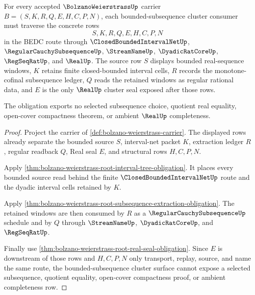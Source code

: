 \begin{theorem}
\label{thm:bolzano-weierstrass-bounded-subsequence-cluster-obligation}
For every accepted $\BolzanoWeierstrassUp$ carrier $B=(S,K,R,Q,E,H,C,P,N)$, each bounded-subsequence cluster consumer must traverse the concrete rows
$$
S,K,R,Q,E,H,C,P,N
$$
in the BEDC route through $\ClosedBoundedIntervalNetUp$, $\RegularCauchySubsequenceUp$, $\StreamNameUp$, $\DyadicRatCoreUp$, $\RegSeqRatUp$, and $\RealUp$. The source row $S$ displays bounded real-sequence windows, $K$ retains finite closed-bounded interval cells, $R$ records the monotone-cofinal subsequence ledger, $Q$ reads the retained windows as regular rational data, and $E$ is the only $\RealUp$ cluster seal exposed after those rows.

The obligation exports no selected subsequence choice, quotient real equality, open-cover compactness theorem, or ambient $\RealUp$ completeness.
\end{theorem}
\begin{proof}
Project the carrier of \autoref{def:bolzano-weierstrass-carrier}. The displayed rows already separate the bounded source $S$, interval-net packet $K$, extraction ledger $R$, regular readback $Q$, Real seal $E$, and structural rows $H,C,P,N$.

Apply \autoref{thm:bolzano-weierstrass-root-interval-tree-obligation}. It places every bounded source read behind the finite $\ClosedBoundedIntervalNetUp$ route and the dyadic interval cells retained by $K$.

Apply \autoref{thm:bolzano-weierstrass-root-subsequence-extraction-obligation}. The retained windows are then consumed by $R$ as a $\RegularCauchySubsequenceUp$ schedule and by $Q$ through $\StreamNameUp$, $\DyadicRatCoreUp$, and $\RegSeqRatUp$.

Finally use \autoref{thm:bolzano-weierstrass-root-real-seal-obligation}. Since $E$ is downstream of those rows and $H,C,P,N$ only transport, replay, source, and name the same route, the bounded-subsequence cluster surface cannot expose a selected subsequence, quotient equality, open-cover compactness proof, or ambient completeness row.
\end{proof}

